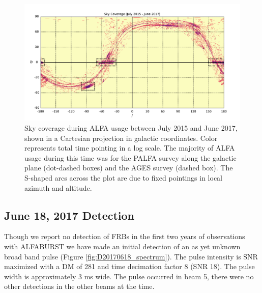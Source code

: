 \documentclass[a4paper,fleqn,usenatbib]{mnras}
\begin{document}
\begin{figure}
    \includegraphics[width=1.0\linewidth]{figures/cartview_sky_coverage.pdf}
    \caption{Sky coverage during ALFA usage between July 2015 and June 2017,
    shown in a Cartesian projection in galactic coordinates. Color represents
    total time pointing in a log scale. The majority of ALFA usage during this
    time was for the PALFA survey along the galactic plane (dot-dashed boxes)
    and the AGES survey (dashed box).  The S-shaped arcs across the plot are due
    to fixed pointings in local azimuth and altitude.
    }
    \label{fig:sky_coverage}
\end{figure}



\subsection{June 18, 2017 Detection}
\label{sec:18062017}

Though we report no detection of FRBs in the first two years of observations
with ALFABURST we have made an initial detection of an as yet unknown broad band
pulse (Figure \ref{fig:D20170618_spectrum}). The pulse intensity is SNR
maximized with a DM of 281 and time decimation factor 8 (SNR 18). The pulse
width is approximately 3 ms wide. The pulse occurred in beam 5, there were no
other detections in the other beams at the time.
\end{document}
